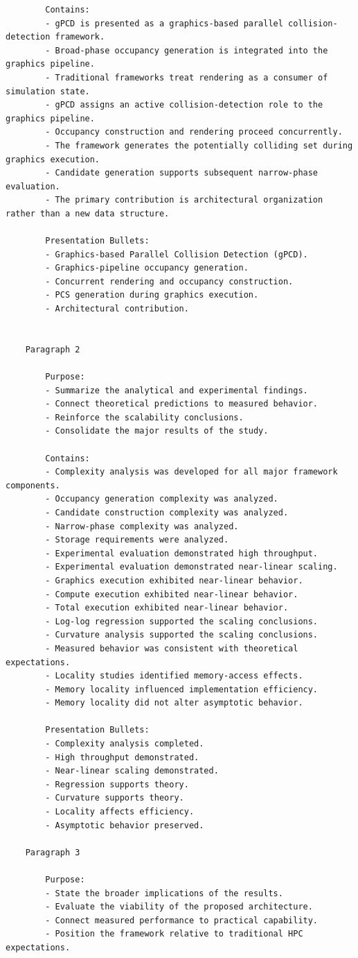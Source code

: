 \begin{verbatim}
		Contains:
		- gPCD is presented as a graphics-based parallel collision-detection framework.
		- Broad-phase occupancy generation is integrated into the graphics pipeline.
		- Traditional frameworks treat rendering as a consumer of simulation state.
		- gPCD assigns an active collision-detection role to the graphics pipeline.
		- Occupancy construction and rendering proceed concurrently.
		- The framework generates the potentially colliding set during graphics execution.
		- Candidate generation supports subsequent narrow-phase evaluation.
		- The primary contribution is architectural organization rather than a new data structure.

		Presentation Bullets:
		- Graphics-based Parallel Collision Detection (gPCD).
		- Graphics-pipeline occupancy generation.
		- Concurrent rendering and occupancy construction.
		- PCS generation during graphics execution.
		- Architectural contribution.


	Paragraph 2

		Purpose:
		- Summarize the analytical and experimental findings.
		- Connect theoretical predictions to measured behavior.
		- Reinforce the scalability conclusions.
		- Consolidate the major results of the study.

		Contains:
		- Complexity analysis was developed for all major framework components.
		- Occupancy generation complexity was analyzed.
		- Candidate construction complexity was analyzed.
		- Narrow-phase complexity was analyzed.
		- Storage requirements were analyzed.
		- Experimental evaluation demonstrated high throughput.
		- Experimental evaluation demonstrated near-linear scaling.
		- Graphics execution exhibited near-linear behavior.
		- Compute execution exhibited near-linear behavior.
		- Total execution exhibited near-linear behavior.
		- Log-log regression supported the scaling conclusions.
		- Curvature analysis supported the scaling conclusions.
		- Measured behavior was consistent with theoretical expectations.
		- Locality studies identified memory-access effects.
		- Memory locality influenced implementation efficiency.
		- Memory locality did not alter asymptotic behavior.

		Presentation Bullets:
		- Complexity analysis completed.
		- High throughput demonstrated.
		- Near-linear scaling demonstrated.
		- Regression supports theory.
		- Curvature supports theory.
		- Locality affects efficiency.
		- Asymptotic behavior preserved.

	Paragraph 3

		Purpose:
		- State the broader implications of the results.
		- Evaluate the viability of the proposed architecture.
		- Connect measured performance to practical capability.
		- Position the framework relative to traditional HPC expectations.


\end{verbatim}
